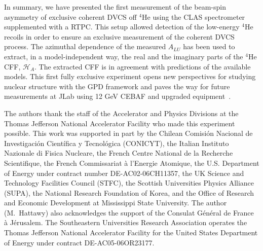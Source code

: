 \documentclass[twocolumn,nofootinbib,showpacs,prl,superscriptaddress,secnumarabic,amssymb,nobibnotes,aps,floatfix]{revtex4}
\begin{document}
In summary, we have presented the first measurement of the beam-spin asymmetry
of exclusive coherent DVCS off $^4$He using the CLAS spectrometer supplemented 
with a RTPC. This setup allowed detection of the 
low-energy $^4$He recoils in order to ensure an exclusive measurement of the
coherent DVCS process. The azimuthal dependence of the measured $A_{LU}$ has 
been used to extract, in a model-independent way, the real and the imaginary 
parts of the $^4$He CFF, $\mathcal{H}_A$. The extracted CFF is in  
agreement with predictions of the available models. This first fully exclusive 
experiment opens new perspectives for studying nuclear structure with the GPD 
framework and paves the way for future measurements at JLab using 12 GeV CEBAF 
and upgraded equipment~\cite{Armstrong:2017wfw}.

The authors thank the staff of the Accelerator and Physics Divisions at the 
Thomas Jefferson National Accelerator Facility who made this experiment 
possible. This work was supported in part by the Chilean Comisi\'on Nacional 
de Investigaci\'on Cient\'ifica y Tecnol\'ogica (CONICYT), the Italian 
Instituto Nazionale di Fisica Nucleare, the French Centre National de la 
Recherche Scientifique, the French Commissariat \`a l'Energie Atomique, the 
U.S. Department of Energy under contract number DE-AC02-06CH11357, the UK 
Science and Technology Facilities Council (STFC), the Scottish Universities 
Physics Alliance (SUPA), the National Research Foundation of Korea, and the 
Office of Research and Economic 
Development at Mississippi State University. The author (M.~Hattawy) also 
acknowledges the support of the Consulat G\'en\'eral de France \`a J\'erusalem.  
The Southeastern Universities Research Association operates the Thomas 
Jefferson National Accelerator Facility for the United States Department of 
Energy under contract DE-AC05-06OR23177.
\end{document}
